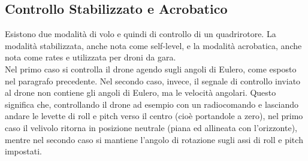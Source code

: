 \subsection{Controllo Stabilizzato e Acrobatico}
Esistono due modalità di volo e quindi di controllo di un quadrirotore. La modalità stabilizzata, anche nota come self-level, e la modalità acrobatica, anche nota come rates e utilizzata per droni da gara.\\

Nel primo caso si controlla il drone agendo sugli angoli di Eulero, come esposto nel paragrafo precedente. Nel secondo caso, invece, il segnale di controllo inviato al drone non contiene gli angoli di Eulero, ma le velocità angolari. Questo significa che, controllando il drone ad esempio con un radiocomando e lasciando andare le levette di roll e pitch verso il centro (cioè portandole a zero), nel primo caso il velivolo ritorna in posizione neutrale (piana ed allineata con l'orizzonte), mentre nel secondo caso si mantiene l'angolo di rotazione sugli assi di roll e pitch impostati.
